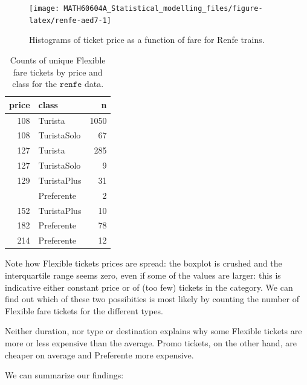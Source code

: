 \documentclass[
  11pt,
  letterpaper,
]{book}
\theoremstyle{definition}
\theoremstyle{definition}
\theoremstyle{definition}
\theoremstyle{definition}
\theoremstyle{remark}
\begin{document}
\begin{figure}

{\centering \texttt{[image: MATH60604A\_Statistical\_modelling\_files/figure-latex/renfe-aed7-1]} 

}

\caption{Histograms of ticket price as a function of fare for Renfe trains.}\label{fig:renfe-aed7}
\end{figure}
\begin{table}

\caption{\label{tab:renfe-aed7}Counts of unique Flexible fare tickets by price and class for the $\texttt{renfe}$ data.}
\centering
\begin{tabular}[t]{rlr}
\toprule
price & class & n\\
\midrule
108 & Turista & 1050\\
108 & TuristaSolo & 67\\
127 & Turista & 285\\
127 & TuristaSolo & 9\\
129 & TuristaPlus & 31\\
\addlinespace
140 & Preferente & 2\\
152 & TuristaPlus & 10\\
182 & Preferente & 78\\
214 & Preferente & 12\\
\bottomrule
\end{tabular}
\end{table}

Note how Flexible tickets prices are spread: the boxplot is crushed and the interquartile range seems zero, even if some of the values are larger: this is indicative either constant price or of (too few) tickets in the category. We can find out which of these two possibities is most likely by counting the number of Flexible fare tickets for the different types.

Neither duration, nor type or destination explains why some Flexible tickets are more or less expensive than the average. Promo tickets, on the other hand, are cheaper on average and Preferente more expensive.

We can summarize our findings:
\end{document}
